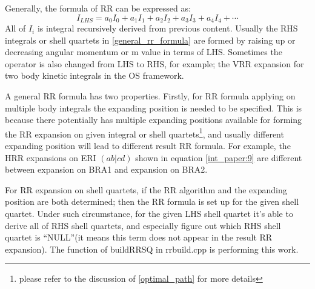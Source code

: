 Generally, the formula of RR can be expressed as:
\begin{equation}\label{general_rr_formula}
 I_{LHS} = a_{0}I_{0} + a_{1}I_{1} + a_{2}I_{2} + a_{3}I_{3} + a_{4}I_{4} + \cdots
\end{equation}
All of $I_{i}$ is integral recursively derived from previous content. Usually the RHS
integrals or shell quartets in \ref{general_rr_formula} are formed by raising up or 
decreasing angular momentum or m value in terms of LHS. Sometimes the operator is also
changed from LHS to RHS, for example; the VRR expansion for two body kinetic integrals
in the OS framework.

A general RR formula has two properties. Firstly, for RR formula applying on
multiple body integrals the expanding position is needed to be specified. This is 
because there potentially has multiple expanding positions available for forming
the RR expansion on given integral or shell quartets\footnote{please refer to the 
discussion of \ref{optimal_path} for more details}, and usually different expanding 
position will lead to different result RR formula. For example, the HRR expansions
on ERI $(ab|cd)$ shown in equation \ref{int_paper:9} are different between expansion
on BRA1 and expansion on BRA2.

For RR expansion on shell quartets, if the RR algorithm and the expanding position
are both determined; then the RR formula is set up for the given shell quartet.
Under such circumstance, for the given LHS shell quartet it's able to derive
all of RHS shell quartets, and especially figure out which RHS shell quartet is 
``NULL''(it means this term does not appear in the result RR expansion). The function
of buildRRSQ in rrbuild.cpp is performing this work.

